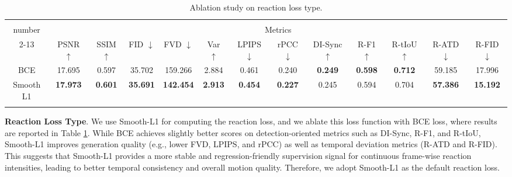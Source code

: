 \begin{table}[!htbp]
    \centering
    \fontsize{7.5pt}{7pt}\selectfont
    \setcellgapes{1.5pt}
    \makegapedcells
    \setlength{\tabcolsep}{2pt}
    \caption{Ablation study on reaction loss type.}
    \label{tab:reaction_loss}
    \begin{tabular}{c|cccccccc|cccc}
        \Xhline{1.2pt}
        
        \multirow{2}{*}{\makecell[c]{Channel\\number}} 
        & \multicolumn{12}{c}{Metrics} \\
        
        \cline{2-13}
        & PSNR $\uparrow$
        & SSIM $\uparrow$
        & FID $\downarrow$
        & FVD $\downarrow$
        & Var $\uparrow$
        & LPIPS $\downarrow$
        & rPCC $\downarrow$
        & DI-Sync $\uparrow$
        & R-F1 $\uparrow$
        & R-tIoU $\uparrow$
        & R-ATD $\downarrow$
        & R-FID $\downarrow$ \\
        
        \hline
        BCE
        & 17.695 & 0.597 & 35.702 & 159.266 & 2.884 & 0.461 
        & 0.240 & \textbf{0.249} & \textbf{0.598} & \textbf{0.712} & 59.185 & 17.996 \\
        
        Smooth L1 
        & \textbf{17.973} & \textbf{0.601} & \textbf{35.691} & \textbf{142.454} & \textbf{2.913} & \textbf{0.454} 
        & \textbf{0.227} & 0.245 & 0.594 & 0.704 & \textbf{57.386} & \textbf{15.192} \\

        \Xhline{1.2pt}
    \end{tabular}
\end{table}

\textbf{Reaction Loss Type}. We use Smooth-L1 for computing the reaction loss, and we ablate this loss function with BCE loss, where results are reported in Table \ref{tab:reaction_loss}. While BCE achieves slightly better scores on detection-oriented metrics such as DI-Sync, R-F1, and R-tIoU, Smooth-L1 improves generation quality (e.g., lower FVD, LPIPS, and rPCC) as well as temporal deviation metrics (R-ATD and R-FID). This suggests that Smooth-L1 provides a more stable and regression-friendly supervision signal for continuous frame-wise reaction intensities, leading to better temporal consistency and overall motion quality. Therefore, we adopt Smooth-L1 as the default reaction loss.